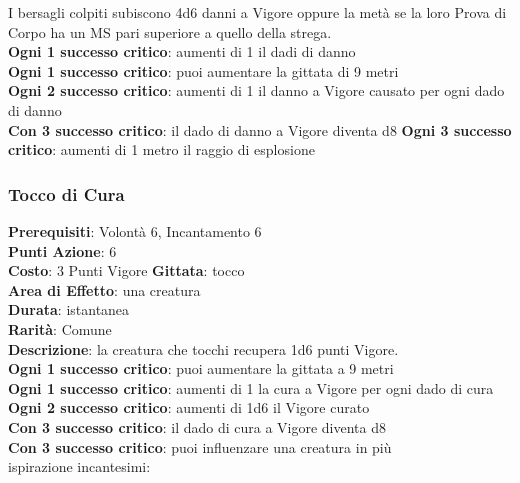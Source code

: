 \documentclass[12pt,a4paper,twoside,openany]{book}
\begin{document}
\begin{multicols}{2}
I bersagli colpiti subiscono 4d6 danni a Vigore oppure la metà se la loro Prova di Corpo ha un MS pari superiore a quello della strega.\\
\textbf{Ogni 1 successo critico}: aumenti di 1 il dadi di danno\\
\textbf{Ogni 1 successo critico}: puoi aumentare la gittata di 9 metri\\
\textbf{Ogni 2 successo critico}: aumenti di 1 il danno a Vigore causato per ogni dado di danno\\
\textbf{Con 3 successo critico}: il dado di danno a Vigore diventa d8
\textbf{Ogni 3 successo critico}: aumenti di 1 metro il raggio di esplosione

\subsubsection*{Tocco di Cura}
\textbf{Prerequisiti}: Volontà 6, Incantamento 6\\
\textbf{Punti Azione}: 6\\
\textbf{Costo}: 3 Punti Vigore
\textbf{Gittata}: tocco \\
\textbf{Area di Effetto}: una creatura\\
\textbf{Durata}: istantanea\\
\textbf{Rarità}: Comune\\
\textbf{Descrizione}: la creatura che tocchi recupera 1d6 punti Vigore.\\
\textbf{Ogni 1 successo critico}: puoi aumentare la gittata a 9 metri\\
\textbf{Ogni 1 successo critico}: aumenti di 1 la cura a Vigore per ogni dado di cura
\textbf{Ogni 2 successo critico}: aumenti di 1d6 il Vigore curato\\
\textbf{Con 3 successo critico}: il dado di cura a Vigore diventa d8\\
\textbf{Con 3 successo critico}: puoi influenzare una creatura in più\\

ispirazione incantesimi:


\end{multicols}
\end{document}
